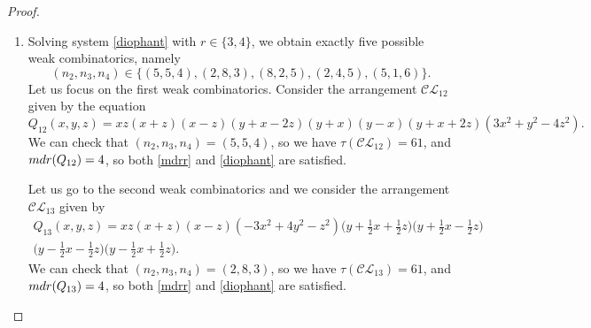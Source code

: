 \documentclass[12pt]{article}
\theoremstyle{plain}
\theoremstyle{definition}
\begin{document}
\begin{proof}
\begin{enumerate}
    Let us now pass to the second weak combinatorics and consider the arrangement $\mathcal{CL}_{10}$ given by
    \begin{multline*}
        Q_{10}(x,y,z) = x(-4x^2 + 12y^2 - 4yz - 5z^2 )\bigg(y+x+\frac{1}{2}z\bigg)\bigg(y-x+\frac{1}{2}z\bigg) \\ \bigg(y-\frac{3}{4}x\bigg)\bigg(y+\frac{3}{4}x\bigg)\bigg(y-2x+ \frac{5}{2}z\bigg)\bigg(y+2x+\frac{5}{2}z\bigg).
    \end{multline*} 
    One can easily check that $\tau(\mathcal{CL}_{10})=48$ and ${\rm mdr}(Q_{10})=4$, hence both \eqref{mdrr} and \eqref{diophant} are satisfied.
    
    Finally, let us pass to the third weak combinatorics. Consider the arrangement $\mathcal{CL}_{11}$ given by
   \begin{multline*}
     Q_{11}(x,y,z) = x(y+x+z)(y-x+z)(3x^2 + 5y^2 - 6yz - 11z^2 ) \\ \bigg(y - \frac{6}{10} x- \frac{22}{10}z \bigg)\bigg(y + \frac{6}{10}x - \frac{22}{10}z\bigg)\bigg(y - \frac{6}{10}x + \frac{2}{10}z \bigg)\bigg(y + \frac{6}{10} x + \frac{2}{10}z\bigg).
   \end{multline*}
   One can check that $\tau(\mathcal{CL}_{11})=48$ and ${\rm mdr}(Q_{10})=4$, so both \eqref{mdrr} and \eqref{diophant} are satisfied.
   

   \item[($d=8$):] Solving system \eqref{diophant} with $r \in \{3,4\}$, we obtain exactly five possible weak combinatorics, namely 
    $$(n_{2},n_{3},n_{4}) \in \{(5,5,4),(2,8,3),(8,2,5),(2,4,5),(5,1,6)\}.$$ 
    Let us focus on the first weak combinatorics. Consider the arrangement $\mathcal{CL}_{12}$ given by the equation
    $$Q_{12}(x,y,z) = xz(x+z)(x-z)(y+x-2z)(y+x)(y-x)(y+x+2z)(3x^{2}+y^{2}-4z^{2}).$$
    We can check that $(n_{2}, n_{3}, n_{4}) = (5,5,4)$, so we have $\tau(\mathcal{CL}_{12})=61$, and ${\rm mdr}(Q_{12})=4$, so both \eqref{mdrr} and \eqref{diophant} are satisfied.

    Let us go to the second weak combinatorics and we consider the arrangement $\mathcal{CL}_{13}$ given by
    \begin{multline*}
    Q_{13}(x,y,z) = xz(x+z)(x-z)(-3x^{2}+4y^{2}-z^{2})\bigg(y+\frac{1}{2}x+\frac{1}{2}z\bigg)\bigg(y+\frac{1}{2}x-\frac{1}{2}z\bigg) \\
    \bigg(y-\frac{1}{2}x-\frac{1}{2}z\bigg)\bigg(y-\frac{1}{2}x+\frac{1}{2}z\bigg).
    \end{multline*}
    We can check that $(n_{2}, n_{3}, n_{4}) = (2,8,3)$, so we have $\tau(\mathcal{CL}_{13})=61$, and ${\rm mdr}(Q_{13})=4$, so both \eqref{mdrr} and \eqref{diophant} are satisfied.
    

\end{enumerate}
\end{proof}
\end{document}
